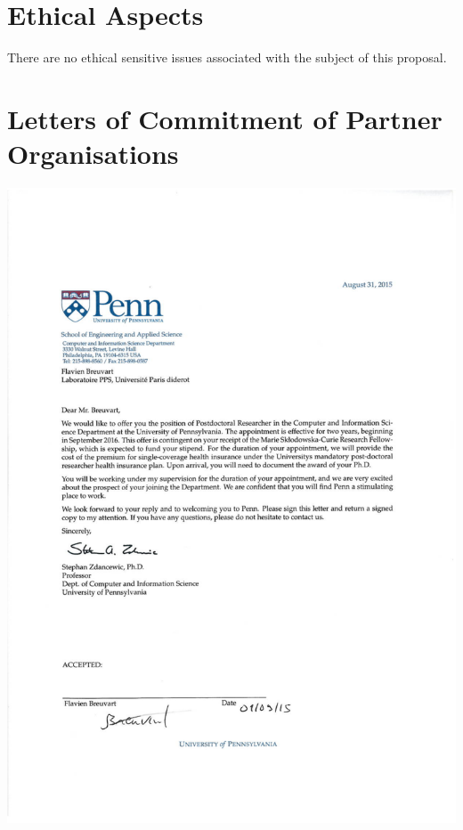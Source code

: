 \documentclass{article}[11pt]
\begin{document}
\section{Ethical Aspects}

There are no ethical sensitive issues associated with the subject of this proposal.

\newpage

\section{Letters of Commitment of Partner Organisations}
\includegraphics[angle=0,origin=c,scale=0.85]{Lettre_of_commitment.pdf}

\label{LastPage}
\end{document}
